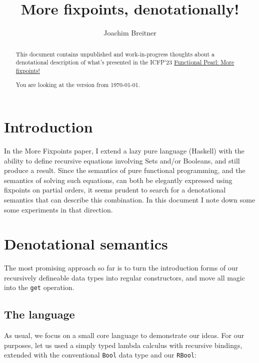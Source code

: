 \documentclass[manuscript,screen,acmsmall,nonacm]{acmart}
\begin{document}
\title{More fixpoints, denotationally!}

\author{Joachim Breitner}


\begin{abstract}
This document contains unpublished and work-in-progress thoughts about a denotational description of what's presented in the ICFP'23
\href{https://joachim-breitner.de/publications/rec-def-pearl.pdf}{Functional Pearl: More fixpoints!}

\medskip\noindent
You are looking at the version from \today.
\end{abstract}

\maketitle

\section{Introduction}

In the More Fixpoints paper, I extend a lazy pure language (Haskell) with the ability to define recursive equations involving Sets and/or Booleans, and still produce a result. Since the semantics of pure functional programming, and the semantics of solving such equations, can both be elegantly expressed using fixpoints on partial orders, it seems prudent to search for a denotational semantics that can describe this combination. In this document I note down some some experiments in that direction.

\section{Denotational semantics}

The most promising approach so far is to turn the introduction forms of our recursively defineable data types into regular constructors, and move all magic into the \texttt{get} operation.

\subsection{The language}

As usual, we focus on a small core language to demonstrate our ideas. For our purposes, let us used a simply typed lambda calculus with recursive bindings, extended with the conventional \texttt{Bool} data type and our \texttt{RBool}:
\end{document}
